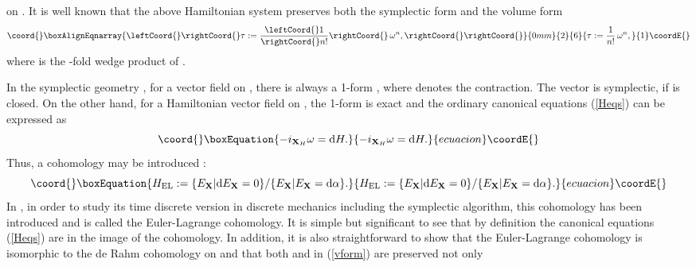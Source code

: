 \documentclass[12pt,a4paper]{article}
\providecommand{\dd}{\mathrm{d}}
\providecommand{\vect}{\mathbf}
\begin{document}
on \coordHE{}. It is well known that the above Hamiltonian
system preserves both the symplectic form \myHighlight{$\omega$}\coordHE{} and the volume
form
\begin{eqnarray}\coord{}\boxAlignEqnarray{\leftCoord{}\rightCoord{}\label{vform}
\tau:=\frac{\leftCoord{}1}{\rightCoord{}n!}\rightCoord{}\, \omega^n, \rightCoord{}
\rightCoord{}}{0mm}{2}{6}{\tau:=\frac{1}{n!}\, \omega^n, 
}{1}\coordE{}\end{eqnarray}
where \coordHE{} is
the \coordHE{}-fold wedge product of \myHighlight{$\omega$}\coordHE{}.

In the symplectic geometry \cite{ST}, for a vector field \myHighlight{$\vect X$}\coordHE{}
on \coordHE{}, there is always a 1-form \myHighlight{$E_{\vect X}:= -
i_{\vect{X}}\omega $}\coordHE{}, where \myHighlight{$i_{\vect{X}}$}\coordHE{} denotes the
contraction. The vector is symplectic, if \coordHE{} is closed.
 On the other
hand, for a Hamiltonian vector field \myHighlight{$\vect{X}_H$}\coordHE{} on
\coordHE{}, the 1-form \myHighlight{$E_{\vect{X}_H}$}\coordHE{} is exact and the
ordinary canonical equations (\ref{Heqs}) can be expressed as
\begin{equation}\coord{}\boxEquation{
  - i_{\vect{X}_H}\omega = \dd H.
}{
  - i_{\vect{X}_H}\omega = \dd H.
}{ecuacion}\coordE{}\end{equation}
Thus, a cohomology
 may be introduced :
\begin{equation}\coord{}\boxEquation{
  H_{\mathrm{EL}}:=\{E_{\vect{X}}|\dd E_{\vect{X}}=0\}/
  \{E_{\vect{X}}|E_{\vect{X}}=\dd \alpha\}.
\label{eq:HEL}
}{
  H_{\mathrm{EL}}:=\{E_{\vect{X}}|\dd E_{\vect{X}}=0\}/
  \{E_{\vect{X}}|E_{\vect{X}}=\dd \alpha\}.
}{ecuacion}\coordE{}\end{equation}
In \cite{ELcoh2, ELcoh4}, in order to study its time discrete
version in discrete mechanics including the symplectic algorithm,
this cohomology has been introduced and is called the
Euler-Lagrange cohomology. It is simple but significant to see
that by definition the canonical equations (\ref{Heqs}) are in the
image of the cohomology. In addition, it is also straightforward
to show that the Euler-Lagrange cohomology is isomorphic to the de
Rahm cohomology on \coordHE{} \cite{gpwz1, gpwz2} and that
both \myHighlight{$\omega$}\coordHE{} and \myHighlight{$\tau$}\coordHE{} in (\ref{vform}) are preserved not only
\end{document}
